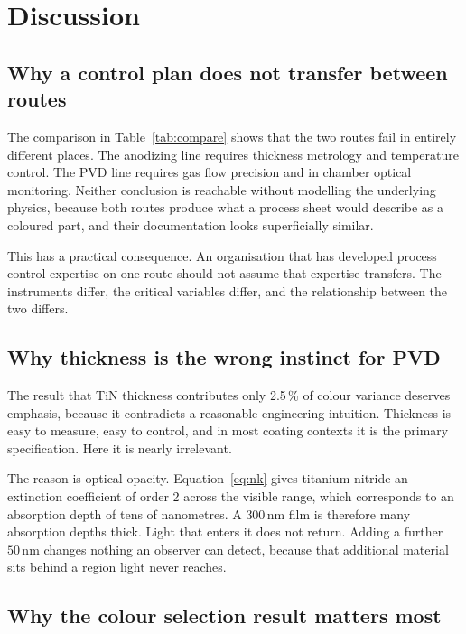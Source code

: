 \documentclass[11pt,a4paper]{article}
\newcommand{\nm}{\ensuremath{\,\mathrm{nm}}}
\begin{document}
\section{Discussion}

\subsection{Why a control plan does not transfer between routes}

The comparison in Table~\ref{tab:compare} shows that the two routes fail in entirely
different places. The anodizing line requires thickness metrology and
temperature control. The PVD line requires gas flow precision and in chamber
optical monitoring. Neither conclusion is reachable without modelling the
underlying physics, because both routes produce what a process sheet would
describe as a coloured part, and their documentation looks superficially
similar.

This has a practical consequence. An organisation that has developed process
control expertise on one route should not assume that expertise transfers. The
instruments differ, the critical variables differ, and the relationship between
the two differs.

\subsection{Why thickness is the wrong instinct for PVD}

The result that TiN thickness contributes only 2.5\,\% of colour variance
deserves emphasis, because it contradicts a reasonable engineering intuition.
Thickness is easy to measure, easy to control, and in most coating contexts it
is the primary specification. Here it is nearly irrelevant.

The reason is optical opacity. Equation~\eqref{eq:nk} gives titanium nitride an
extinction coefficient of order 2 across the visible range, which corresponds
to an absorption depth of tens of nanometres. A $300\nm$ film is therefore many
absorption depths thick. Light that enters it does not return. Adding a further
$50\nm$ changes nothing an observer can detect, because that additional
material sits behind a region light never reaches.

\subsection{Why the colour selection result matters most}
\end{document}
